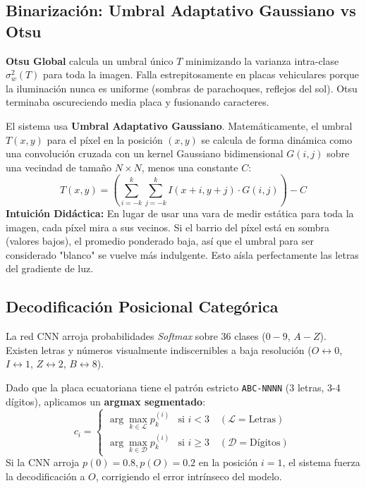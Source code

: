 \documentclass[11pt,a4paper]{article}
\begin{document}
\subsection{Binarizaci\'on: Umbral Adaptativo Gaussiano vs Otsu}
\textbf{Otsu Global} calcula un umbral \'unico $T$ minimizando la varianza intra-clase $\sigma_w^2(T)$ para toda la imagen. Falla estrepitosamente en placas vehiculares porque la iluminaci\'on nunca es uniforme (sombras de parachoques, reflejos del sol). Otsu terminaba oscureciendo media placa y fusionando caracteres.

El sistema usa \textbf{Umbral Adaptativo Gaussiano}. Matem\'aticamente, el umbral $T(x,y)$ para el p\'ixel en la posici\'on $(x,y)$ se calcula de forma din\'amica como una convoluci\'on cruzada con un kernel Gaussiano bidimensional $G(i,j)$ sobre una vecindad de tama\~no $N \times N$, menos una constante $C$:
\begin{equation}
T(x,y) = \left( \sum_{i=-k}^{k} \sum_{j=-k}^{k} I(x+i, y+j) \cdot G(i,j) \right) - C
\end{equation}
\textbf{Intuici\'on Did\'actica:} En lugar de usar una vara de medir est\'atica para toda la imagen, cada p\'ixel mira a sus vecinos. Si el barrio del p\'ixel est\'a en sombra (valores bajos), el promedio ponderado baja, as\'i que el umbral para ser considerado "blanco" se vuelve m\'as indulgente. Esto a\'isla perfectamente las letras del gradiente de luz.

\subsection{Decodificaci\'on Posicional Categ\'orica}
La red CNN arroja probabilidades \emph{Softmax} sobre 36 clases ($0-9$, $A-Z$). Existen letras y n\'umeros visualmente indiscernibles a baja resoluci\'on ($O \leftrightarrow 0$, $I \leftrightarrow 1$, $Z \leftrightarrow 2$, $B \leftrightarrow 8$).

Dado que la placa ecuatoriana tiene el patr\'on estricto \texttt{ABC-NNNN} (3 letras, 3-4 d\'igitos), aplicamos un \textbf{argmax segmentado}:
\[
c_i =
\begin{cases}
\arg\max_{k\in\mathcal{L}} p^{(i)}_k & \text{si } i < 3 \quad (\mathcal{L} = \text{Letras})\\
\arg\max_{k\in\mathcal{D}} p^{(i)}_k & \text{si } i \geq 3 \quad (\mathcal{D} = \text{D\'igitos})
\end{cases}
\]
Si la CNN arroja $p(0)=0.8, p(O)=0.2$ en la posici\'on $i=1$, el sistema fuerza la decodificaci\'on a $O$, corrigiendo el error intr\'inseco del modelo.
\end{document}

